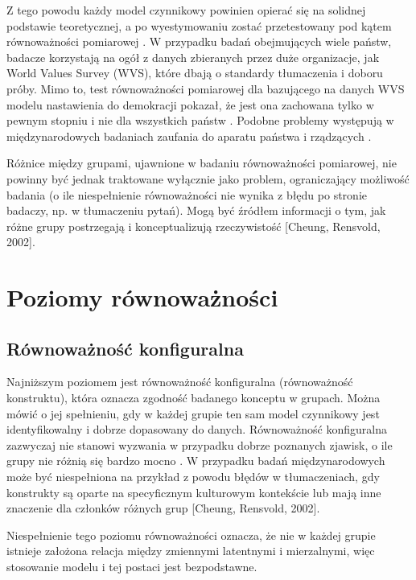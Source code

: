 \documentclass[12pt]{article}
\begin{document}
Z tego powodu każdy model czynnikowy powinien opierać się na solidnej podstawie teoretycznej, a po wyestymowaniu zostać przetestowany pod kątem równoważności pomiarowej \citep{LubGlog}. W przypadku badań obejmujących wiele państw, badacze korzystają na ogół z danych zbieranych przez duże organizacje, jak World Values Survey (WVS), które dbają o standardy tłumaczenia i doboru próby. Mimo to, test równoważności pomiarowej dla bazującego na danych WVS modelu nastawienia do demokracji pokazał, że jest ona zachowana tylko w pewnym stopniu i nie dla wszystkich państw \citep{ArDav}. Podobne problemy występują w międzynarodowych badaniach zaufania do aparatu państwa i rządzących \citep{Schneider}.

Różnice między grupami, ujawnione w badaniu równoważności pomiarowej, nie powinny być jednak traktowane wyłącznie jako problem, ograniczający możliwość badania (o ile niespełnienie równoważności nie wynika z błędu po stronie badaczy, np. w tłumaczeniu pytań). Mogą być źródłem informacji o tym, jak różne grupy postrzegają i konceptualizują rzeczywistość {[}Cheung, Rensvold, 2002{]}.

\hypertarget{poziomy-ruxf3wnowaux17cnoux15bci}{%
\section{Poziomy równoważności}\label{poziomy-ruxf3wnowaux17cnoux15bci}}

\hypertarget{ruxf3wnowaux17cnoux15bux107-konfiguralna}{%
\subsection{Równoważność konfiguralna}\label{ruxf3wnowaux17cnoux15bux107-konfiguralna}}

Najniższym poziomem jest równoważność konfiguralna (równoważność konstruktu), która oznacza zgodność badanego konceptu w grupach. Można mówić o jej spełnieniu, gdy w każdej grupie ten sam model czynnikowy jest identyfikowalny i dobrze dopasowany do danych. Równoważność konfiguralna zazwyczaj nie stanowi wyzwania w przypadku dobrze poznanych zjawisk, o ile grupy nie różnią się bardzo mocno \citep{LubGlog}. W przypadku badań międzynarodowych może być niespełniona na przykład z powodu błędów w tłumaczeniach, gdy konstrukty są oparte na specyficznym kulturowym kontekście lub mają inne znaczenie dla członków różnych grup {[}Cheung, Rensvold, 2002{]}.

Niespełnienie tego poziomu równoważności oznacza, że nie w każdej grupie istnieje założona relacja między zmiennymi latentnymi i mierzalnymi, więc stosowanie modelu i tej postaci jest bezpodstawne.
\end{document}
